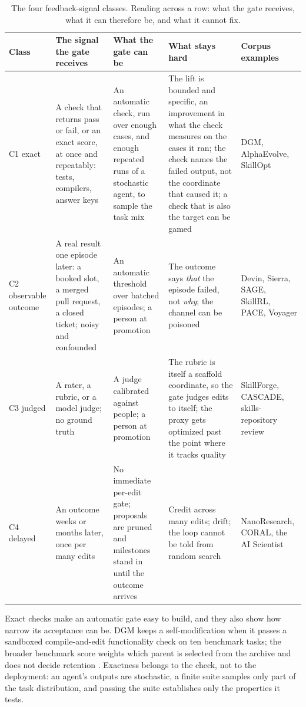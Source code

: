 \begin{table}[t]
\centering
\small
\begin{tabular}{>{\raggedright\arraybackslash}p{}>{\raggedright\arraybackslash}p{}>{\raggedright\arraybackslash}p{}>{\raggedright\arraybackslash}p{}>{\raggedright\arraybackslash}p{}}
\toprule
Class & The signal the gate receives & What the gate can be & What stays hard & Corpus examples \\
\midrule
C1 exact & A check that returns pass or fail, or an exact score, at once and repeatably: tests, compilers, answer keys & An automatic check, run over enough cases, and enough repeated runs of a stochastic agent, to sample the task mix & The lift is bounded and specific, an improvement in what the check measures on the cases it ran; the check names the failed output, not the coordinate that caused it; a check that is also the target can be gamed & DGM, AlphaEvolve, SkillOpt \\
C2 observable outcome & A real result one episode later: a booked slot, a merged pull request, a closed ticket; noisy and confounded & An automatic threshold over batched episodes; a person at promotion & The outcome says \emph{that} the episode failed, not \emph{why}; the channel can be poisoned & Devin, Sierra, SAGE, SkillRL, PACE, Voyager \\
C3 judged & A rater, a rubric, or a model judge; no ground truth & A judge calibrated against people; a person at promotion & The rubric is itself a scaffold coordinate, so the gate judges edits to itself; the proxy gets optimized past the point where it tracks quality & SkillForge, CASCADE, skills-repository review \\
C4 delayed & An outcome weeks or months later, once per many edits & No immediate per-edit gate; proposals are pruned and milestones stand in until the outcome arrives & Credit across many edits; drift; the loop cannot be told from random search & NanoResearch, CORAL, the AI Scientist \\
\bottomrule
\end{tabular}
\caption{The four feedback-signal classes. Reading across a row: what the gate receives, what it can therefore be, and what it cannot fix.}
\label{tab:classes}
\end{table}

Exact checks make an automatic gate easy to build, and they also show how narrow its acceptance can be. DGM keeps a self-modification when it passes a sandboxed compile-and-edit functionality check on ten benchmark tasks; the broader benchmark score weights which parent is selected from the archive and does not decide retention \citep{zhang2025darwin}. Exactness belongs to the check, not to the deployment: an agent's outputs are stochastic, a finite suite samples only part of the task distribution, and passing the suite establishes only the properties it tests.

